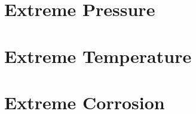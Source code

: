 \documentclass{hdnotes}
\begin{document}
\part{Extreme Pressure}

\part{Extreme Temperature}



\part{Extreme Corrosion}

\end{document}
